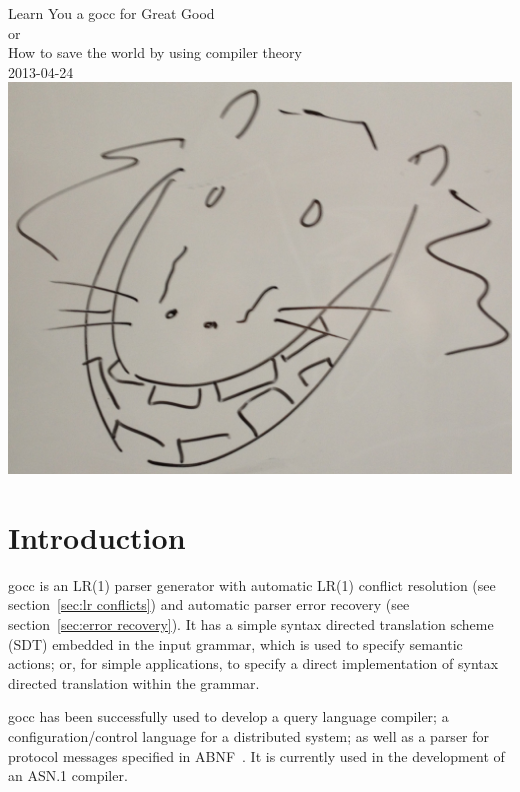 \documentclass[12pt]{article}
\begin{document}
\begin{center}
	{\Huge Learn You a gocc for Great Good} \\
	{\large or \\
	How to save the world by using compiler theory \\
	\vspace{1cm}
	2013-04-24}\\
	\vspace{1cm}
	\includegraphics[scale=.1]{gocc}
\end{center}
\tableofcontents

\newcommand{\TBD}{\textcolor{red}{TBD}}
\newcommand{\TBDx}[1]{\textcolor{red}{TBD:} #1}
\newcommand{\Go}{{\em Go}\ }
\newcommand{\Code}[1]{{\bf #1} } 
\newcommand{\gocc}{{\em gocc}\ }
\newcommand{\Clang}{{\em C} language}

\section{Introduction}
	gocc is an LR(1) parser generator with automatic LR(1) conflict resolution (see section~\ref{sec:lr conflicts}) and automatic parser error recovery (see section~\ref{sec:error recovery}). It has a simple syntax directed translation scheme (SDT) embedded in the input grammar, which is used to specify semantic actions; or, for simple applications, to specify a direct implementation of syntax directed translation within the grammar.

	gocc has been successfully used to develop a query language compiler; a configuration/control language for a distributed system; as well as a parser for protocol messages specified in ABNF~\cite{ABNF}. It is currently used in the development of an ASN.1 compiler.
\end{document}
